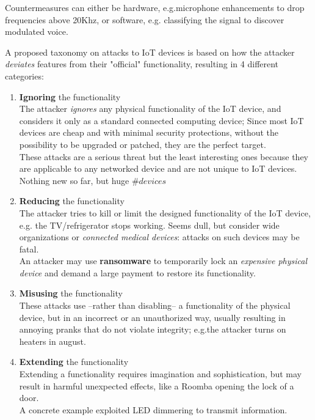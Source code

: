 
Countermeasures can either be hardware, e.g.microphone enhancements to drop frequencies above 20Khz, or software, e.g. classifying the signal to discover modulated voice.
\nl

A proposed taxonomy on attacks to IoT devices is based on how the attacker \textit{deviates} features from their "official" functionality,
resulting in 4 different categories:
\begin{enumerate}
   \item \textbf{Ignoring} the functionality\\
   The attacker \textit{ignores} any physical functionality of the IoT device, and considers it only as a standard connected computing device;
   Since most IoT devices are cheap and with minimal security protections,
   without the possibility to be upgraded or patched, they are the perfect target.\\
   These attacks are a serious threat but the least interesting ones because they
   are applicable to any networked device and are not unique to IoT devices.
   Nothing new so far, but huge $\#devices$
   \item \textbf{Reducing} the functionality\\
   The attacker tries to kill or limit the designed functionality of the IoT device, e.g. the TV/refrigerator stops working.
   Seems dull, but consider wide organizations or \textit{connected medical devices}:
   attacks on such devices may be fatal.\\
   An attacker may use \textbf{ransomware} to temporarily lock an
   \textit{expensive physical device} and demand a large payment to restore its
   functionality.
   \item \textbf{Misusing} the functionality\\
   These attacks use {--}rather than disabling{--} a functionality of the
   physical device, but in an incorrect or an unauthorized way,
   usually resulting in annoying pranks that do not violate integrity;
   e.g.the attacker turns on heaters in august.
   \item \textbf{Extending} the functionality\\
   Extending a functionality requires imagination and sophistication,
   but may result in harmful unexpected effects, like a Roomba opening the lock of a door.\\
   A concrete example exploited LED dimmering to transmit information.
\end{enumerate}

